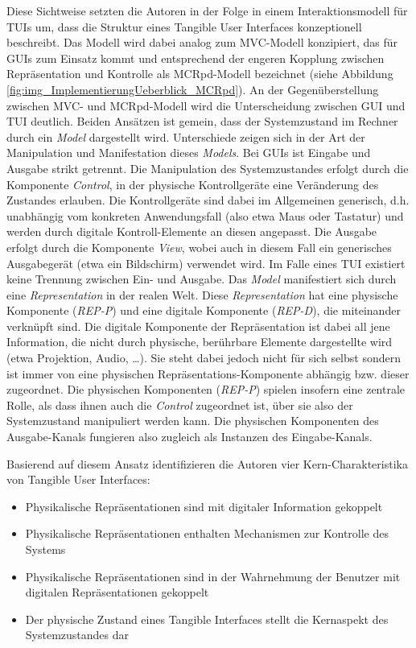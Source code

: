 Diese Sichtweise setzten die Autoren in der Folge in einem Interaktionsmodell für \glspl{TUI} um, dass die Struktur eines Tangible User Interfaces konzeptionell beschreibt. Das Modell wird dabei analog zum \gls{MVC}-Modell konzipiert, das für \glspl{GUI} zum Einsatz kommt und entsprechend der engeren Kopplung zwischen Repräsentation und Kontrolle als \gls{MCRpd}-Modell bezeichnet (siehe Abbildung \ref{fig:img_ImplementierungUeberblick_MCRpd}). An der Gegenüberstellung zwischen \gls{MVC}- und \gls{MCRpd}-Modell wird die Unterscheidung zwischen \gls{GUI} und \gls{TUI} deutlich. Beiden Ansätzen ist gemein, dass der Systemzustand im Rechner durch ein \emph{Model} dargestellt wird. Unterschiede zeigen sich in der Art der Manipulation und Manifestation dieses \emph{Models}. Bei \glspl{GUI} ist Eingabe und Ausgabe strikt getrennt. Die Manipulation des Systemzustandes erfolgt durch die Komponente \emph{Control}, in der physische Kontrollgeräte eine Veränderung des Zustandes erlauben. Die Kontrollgeräte sind dabei im Allgemeinen generisch, d.h. unabhängig vom konkreten Anwendungsfall (also etwa Maus oder Tastatur) und werden durch digitale Kontroll-Elemente an diesen angepasst. Die Ausgabe erfolgt durch die Komponente \emph{View}, wobei auch in diesem Fall ein generisches Ausgabegerät (etwa ein Bildschirm) verwendet wird. Im Falle eines \gls{TUI} existiert keine Trennung zwischen Ein- und Ausgabe. Das \emph{Model} manifestiert sich durch eine \emph{Representation} in der realen Welt. Diese \emph{Representation} hat eine physische Komponente (\emph{REP-P}) und eine digitale Komponente (\emph{REP-D}), die miteinander verknüpft sind. Die digitale Komponente der Repräsentation ist dabei all jene Information, die nicht durch physische, berührbare Elemente dargestellte wird (etwa Projektion, Audio, \ldots). Sie steht dabei jedoch nicht für sich selbst sondern ist immer von eine physischen Repräsentations-Komponente abhängig bzw. dieser zugeordnet. Die physischen Komponenten (\emph{REP-P}) spielen insofern eine zentrale Rolle, als dass ihnen auch die \emph{Control} zugeordnet ist, über sie also der Systemzustand manipuliert werden kann. Die physischen Komponenten des Ausgabe-Kanals fungieren also zugleich als Instanzen des Eingabe-Kanals.

Basierend auf diesem Ansatz identifizieren die Autoren vier Kern-Charakteristika von Tangible User Interfaces:
\begin{itemize}
	\item Physikalische Repräsentationen sind mit digitaler Information gekoppelt
	\item Physikalische Repräsentationen enthalten Mechanismen zur Kontrolle des Systems
	\item Physikalische Repräsentationen sind in der Wahrnehmung der Benutzer mit digitalen Repräsentationen gekoppelt
	\item Der physische Zustand eines Tangible Interfaces stellt die Kernaspekt des Systemzustandes dar
\end{itemize}

